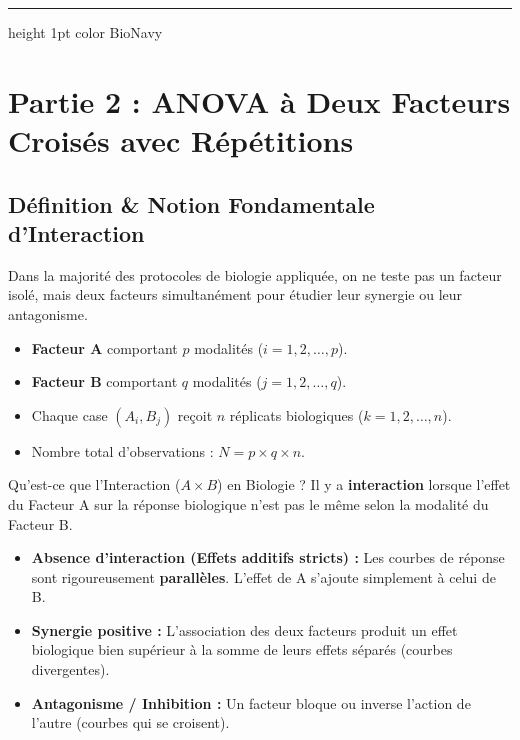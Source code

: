 \documentclass[11pt,a4paper]{article}
\begin{document}
\vspace{4mm}
\hrule height 1pt color BioNavy
\vspace{4mm}

\section{Partie 2 : ANOVA à Deux Facteurs Croisés avec Répétitions}

\subsection{Définition \& Notion Fondamentale d'Interaction}
Dans la majorité des protocoles de biologie appliquée, on ne teste pas un facteur isolé, mais deux facteurs simultanément pour étudier leur synergie ou leur antagonisme.
\begin{itemize}[leftmargin=*, label=\faAngleRight]
  \item \textbf{Facteur A} comportant $p$ modalités ($i = 1, 2, \dots, p$).
  \item \textbf{Facteur B} comportant $q$ modalités ($j = 1, 2, \dots, q$).
  \item Chaque case $(A_i, B_j)$ reçoit $n$ réplicats biologiques ($k = 1, 2, \dots, n$).
  \item Nombre total d'observations : $N = p \times q \times n$.
\end{itemize}

\begin{conceptbox}{Qu'est-ce que l'Interaction ($A \times B$) en Biologie ?}
Il y a \textbf{interaction} lorsque l'effet du Facteur A sur la réponse biologique n'est pas le même selon la modalité du Facteur B.
\begin{itemize}[leftmargin=*, label=\faCheck]
  \item \textbf{Absence d'interaction (Effets additifs stricts) :} Les courbes de réponse sont rigoureusement \textbf{parallèles}. L'effet de A s'ajoute simplement à celui de B.
  \item \textbf{Synergie positive :} L'association des deux facteurs produit un effet biologique bien supérieur à la somme de leurs effets séparés (courbes divergentes).
  \item \textbf{Antagonisme / Inhibition :} Un facteur bloque ou inverse l'action de l'autre (courbes qui se croisent).
\end{itemize}
\end{conceptbox}
\end{document}
